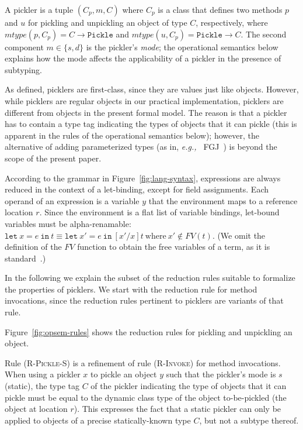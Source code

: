 \documentclass[10pt]{sigplanconf}
\theoremstyle{definition}
\theoremstyle{definition}
\newcommand{\eg}{{\em e.g.,~}}
\begin{document}
A pickler is a tuple $(C_p, m, C)$ where $C_p$ is a class that defines two
methods $p$ and $u$ for pickling and unpickling an object of type $C$,
respectively, where $mtype(p, C_p) = C \rightarrow \texttt{Pickle}$ and
$mtype(u, C_p) = \texttt{Pickle} \rightarrow C$.
The second component $m \in \{s, d\}$ is the pickler's {\em
mode}; the operational semantics below explains how the mode affects the
applicability of a pickler in the presence of subtyping.

As defined, picklers are first-class, since they are values just like objects.
However, while picklers are regular objects in our practical implementation,
picklers are different from objects in the present formal model. The reason is
that a pickler has to contain a type tag indicating the types of objects that
it can pickle (this is apparent in the rules of the operational semantics
below); however, the alternative of adding parameterized types (as in, \eg
FGJ~\cite{Igarashi2001}) is beyond the scope of the present paper.

According to the grammar in Figure~\ref{fig:lang-syntax}, expressions are
always reduced in the context of a let-binding, except for field assignments.
Each operand of an expression is a variable $y$ that the environment maps to a
reference location $r$. Since the environment is a ﬂat list of variable
bindings, let-bound variables must be alpha-renamable:
$\texttt{let}~x = e~\texttt{in}~t \equiv \texttt{let}~x' =
e~\texttt{in}~[x'/x]t~\text{where}~x' \notin FV(t)$. (We omit the
definition of the $FV$ function to obtain the free variables of a
term, as it is standard~\cite{TAPL}.)

In the following we explain the subset of the reduction rules suitable to
formalize the properties of picklers. We start with the reduction rule for
method invocations, since the reduction rules pertinent to picklers are
variants of that rule.

Figure~\ref{fig:opsem-rules} shows the reduction rules for pickling and
unpickling an object.

Rule \textsc{(R-Pickle-S)} is a refinement of rule \textsc{(R-Invoke)} for method invocations.
When using a pickler $x$ to pickle an object $y$ such that the pickler's mode
is $s$ (static), the type tag $C$ of the pickler indicating the type of
objects that it can pickle must be equal to the dynamic class type of the
object to-be-pickled (the object at location $r$). This expresses the fact
that a static pickler can only be applied to objects of a precise statically-known
type $C$, but not a subtype thereof.
\end{document}
